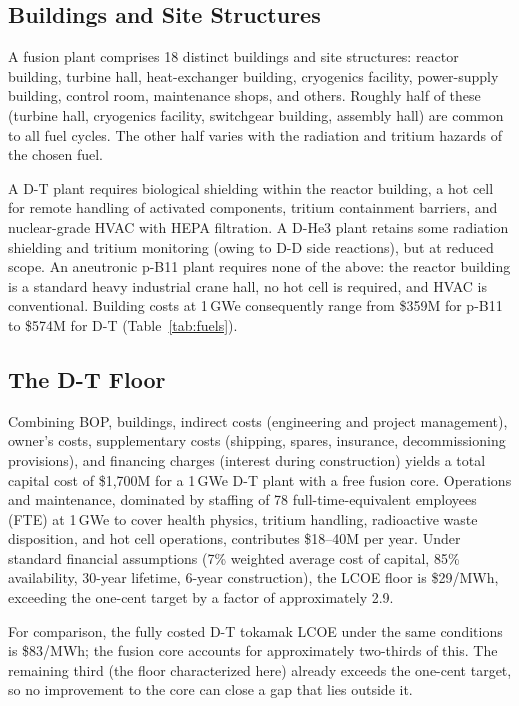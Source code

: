 \documentclass{article}
\begin{document}
\subsection{Buildings and Site Structures}
\label{sec:buildings}

A fusion plant comprises 18 distinct buildings and
site structures: reactor building, turbine hall, heat-exchanger
building, cryogenics facility, power-supply building, control room,
maintenance shops, and others. Roughly half of these (turbine hall,
cryogenics facility, switchgear building, assembly hall) are common to all
fuel cycles. The other half varies with the radiation and tritium
hazards of the chosen fuel.

A D-T plant requires biological shielding within the reactor
building, a hot cell for remote handling of activated components,
tritium containment barriers, and nuclear-grade HVAC with HEPA
filtration. A D-He3 plant retains some radiation shielding
and tritium monitoring (owing to D-D side reactions), but at reduced
scope. An aneutronic p-B11 plant requires none of the above: the
reactor building is a standard heavy industrial crane hall, no hot
cell is required, and HVAC is conventional. Building costs at
1\,GWe consequently range from \$359M for p-B11 to \$574M for D-T
(Table~\ref{tab:fuels}).

\subsection{The D-T Floor}
\label{sec:dt}

Combining BOP, buildings, indirect costs (engineering and project
management), owner's costs,
supplementary costs (shipping, spares, insurance, decommissioning
provisions), and financing charges (interest during construction)
yields a total capital cost of \$1{,}700M for a 1\,GWe D-T plant
with a free fusion core. Operations and maintenance, dominated by
staffing of 78 full-time-equivalent employees (FTE) at
1\,GWe to cover health physics, tritium handling, radioactive waste
disposition, and hot cell operations, contributes \$18--40M per
year. Under standard financial assumptions (7\% weighted average
cost of capital, 85\% availability, 30-year lifetime, 6-year
construction), the LCOE floor is \$29/MWh, exceeding the one-cent
target by a factor of approximately 2.9.

For comparison, the fully costed D-T tokamak LCOE under the same
conditions is \$83/MWh; the fusion core accounts for approximately
two-thirds of this. The remaining third (the floor characterized
here) already exceeds the one-cent target, so no improvement to the
core can close a gap that lies outside it.
\end{document}
